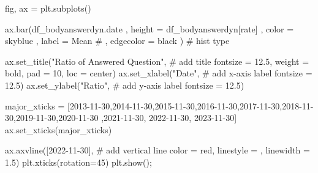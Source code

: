 \documentclass[
  letterpaper,
  DIV=11,
  numbers=noendperiod]{scrartcl}
\newenvironment{Shaded}{\begin{snugshade}}{\end{snugshade}}
\newcommand{\CommentTok}[1]{\textcolor[rgb]{0.37,0.37,0.37}{#1}}
\newcommand{\DecValTok}[1]{\textcolor[rgb]{0.68,0.00,0.00}{#1}}
\newcommand{\FloatTok}[1]{\textcolor[rgb]{0.68,0.00,0.00}{#1}}
\newcommand{\NormalTok}[1]{\textcolor[rgb]{0.00,0.23,0.31}{#1}}
\newcommand{\OperatorTok}[1]{\textcolor[rgb]{0.37,0.37,0.37}{#1}}
\newcommand{\StringTok}[1]{\textcolor[rgb]{0.13,0.47,0.30}{#1}}
\begin{document}
\begin{Shaded}
\begin{Highlighting}[]
\NormalTok{fig, ax }\OperatorTok{=}\NormalTok{ plt.subplots()}


\NormalTok{ax.bar(df\_bodyanswerdyn.date}
\NormalTok{    ,  height }\OperatorTok{=}\NormalTok{ df\_bodyanswerdyn[}\StringTok{\textquotesingle{}rate\textquotesingle{}}\NormalTok{]}
\NormalTok{    ,  color }\OperatorTok{=} \StringTok{\textquotesingle{}skyblue\textquotesingle{}}
\NormalTok{    ,  label }\OperatorTok{=} \StringTok{\textquotesingle{}Mean\textquotesingle{}}
    \CommentTok{\# ,  edgecolor = \textquotesingle{}black\textquotesingle{}}
\NormalTok{      ) }\CommentTok{\# hist type}

\NormalTok{ax.set\_title(}\StringTok{"Ratio of Answered Question"}\NormalTok{, }\CommentTok{\# add title}
\NormalTok{             fontsize }\OperatorTok{=} \FloatTok{12.5}\NormalTok{,}
\NormalTok{             weight }\OperatorTok{=} \StringTok{\textquotesingle{}bold\textquotesingle{}}\NormalTok{,}
\NormalTok{             pad }\OperatorTok{=} \DecValTok{10}\NormalTok{,}
\NormalTok{             loc }\OperatorTok{=} \StringTok{\textquotesingle{}center\textquotesingle{}}\NormalTok{)}
\NormalTok{ax.set\_xlabel(}\StringTok{"Date"}\NormalTok{, }\CommentTok{\# add x{-}axis label}
\NormalTok{              fontsize }\OperatorTok{=} \FloatTok{12.5}\NormalTok{)}
\NormalTok{ax.set\_ylabel(}\StringTok{"Ratio"}\NormalTok{, }\CommentTok{\# add y{-}axis label}
\NormalTok{              fontsize }\OperatorTok{=} \FloatTok{12.5}\NormalTok{)}

\NormalTok{major\_xticks }\OperatorTok{=}\NormalTok{ [}\StringTok{\textquotesingle{}2013{-}11{-}30\textquotesingle{}}\NormalTok{,}\StringTok{\textquotesingle{}2014{-}11{-}30\textquotesingle{}}\NormalTok{,}\StringTok{\textquotesingle{}2015{-}11{-}30\textquotesingle{}}\NormalTok{,}\StringTok{\textquotesingle{}2016{-}11{-}30\textquotesingle{}}\NormalTok{,}\StringTok{\textquotesingle{}2017{-}11{-}30\textquotesingle{}}\NormalTok{,}\StringTok{\textquotesingle{}2018{-}11{-}30\textquotesingle{}}\NormalTok{,}\StringTok{\textquotesingle{}2019{-}11{-}30\textquotesingle{}}\NormalTok{,}\StringTok{\textquotesingle{}2020{-}11{-}30\textquotesingle{}}
\NormalTok{                ,}\StringTok{\textquotesingle{}2021{-}11{-}30\textquotesingle{}}\NormalTok{, }\StringTok{\textquotesingle{}2022{-}11{-}30\textquotesingle{}}\NormalTok{, }\StringTok{\textquotesingle{}2023{-}11{-}30\textquotesingle{}}\NormalTok{]}
\NormalTok{ax.set\_xticks(major\_xticks)}

\NormalTok{ax.axvline([}\StringTok{\textquotesingle{}2022{-}11{-}30\textquotesingle{}}\NormalTok{], }\CommentTok{\# add vertical line}
\NormalTok{           color }\OperatorTok{=} \StringTok{\textquotesingle{}red\textquotesingle{}}\NormalTok{,}
\NormalTok{           linestyle }\OperatorTok{=} \StringTok{\textquotesingle{}{-}{-}\textquotesingle{}}\NormalTok{,}
\NormalTok{           linewidth }\OperatorTok{=} \FloatTok{1.5}\NormalTok{)}
\NormalTok{plt.xticks(rotation}\OperatorTok{=}\DecValTok{45}\NormalTok{)}
\NormalTok{plt.show()}\OperatorTok{;}
\end{Highlighting}
\end{Shaded}
\end{document}
